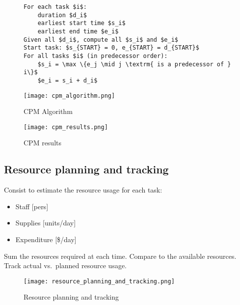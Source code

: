 \begin{figure}[!ht]
\begin{minipage}{\linewidth}
    \begin{minipage}[t]{0.6\linewidth}
        \begin{lstlisting}[mathescape]
For each task $i$:
    duration $d_i$
    earliest start time $s_i$
    earliest end time $e_i$
Given all $d_i$, compute all $s_i$ and $e_i$
Start task: $s_{START} = 0, e_{START} = d_{START}$
For all tasks $i$ (in predecessor order):
    $s_i = \max \{e_j \mid j \textrm{ is a predecessor of } i\}$
    $e_i = s_i + d_i$
        \end{lstlisting}
    \end{minipage}
    \begin{minipage}{0.35\linewidth}
        \texttt{[image: cpm\_algorithm.png]}
        \caption{CPM Algorithm}
    \end{minipage}
\end{minipage}
    \centering
    \texttt{[image: cpm\_results.png]}
    \caption{CPM results}
\end{figure}

\subsection{Resource planning and tracking}

Consist to estimate the resource usage for each task:

\begin{itemize}
    \item Staff [pers]
    \item Supplies [units/day]
    \item Expenditure [\$/day]
\end{itemize}

Sum the resources required at each time. \newline
Compare to the available resources. \newline
Track actual vs.\ planned resource usage. \newline

\begin{figure}[!ht]
    \centering
    \texttt{[image: resource\_planning\_and\_tracking.png]}
    \caption{Resource planning and tracking}
\end{figure}
